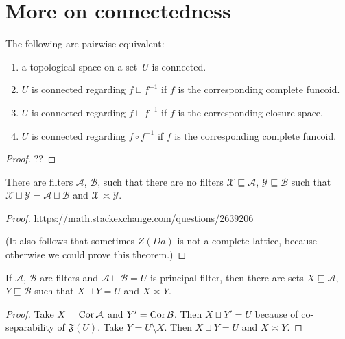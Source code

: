 \chapter{More on connectedness}

\begin{prop}
The following are pairwise equivalent:
\begin{enumerate}
 \item a topological space on a set~$U$ is connected.
 \item $U$ is connected regarding $f\sqcup f^{-1}$ if $f$ is the corresponding
   complete funcoid.
 \item $U$ is connected regarding $f\sqcup f^{-1}$ if $f$ is the corresponding
   closure space.
 \item $U$ is connected regarding $f\circ f^{-1}$ if $f$ is the corresponding
   complete funcoid.
\end{enumerate}
\end{prop}

\begin{proof}
??
\end{proof}

\begin{prop}
  There are filters $\mathcal{A}$, $\mathcal{B}$, such that there are no
  filters $\mathcal{X} \sqsubseteq \mathcal{A}$, $\mathcal{Y} \sqsubseteq
  \mathcal{B}$ such that $\mathcal{X} \sqcup \mathcal{Y} = \mathcal{A} \sqcup
  \mathcal{B}$ and $\mathcal{X} \asymp \mathcal{Y}$.
\end{prop}

\begin{proof}
  \url{https://math.stackexchange.com/questions/2639206}

  (It also follows that sometimes $Z (D a)$ is not a complete lattice, because
  otherwise we could prove this theorem.)
\end{proof}

\begin{prop}
  If $\mathcal{A}$, $\mathcal{B}$ are filters and $\mathcal{A} \sqcup
  \mathcal{B} = U$ is principal filter, then there are sets $X \sqsubseteq
  \mathcal{A}$, $Y \sqsubseteq \mathcal{B}$ such that $X \sqcup Y = U$ and $X
  \asymp Y$.
\end{prop}

\begin{proof}
  Take $X = \operatorname{Cor} \mathcal{A}$ and $Y' = \operatorname{Cor} \mathcal{B}$. Then $X
  \sqcup Y' = U$ because of co-separability of $\mathfrak{F} (U)$. Take $Y = U
  \setminus X$. Then $X \sqcup Y = U$ and $X \asymp Y$.
\end{proof}

